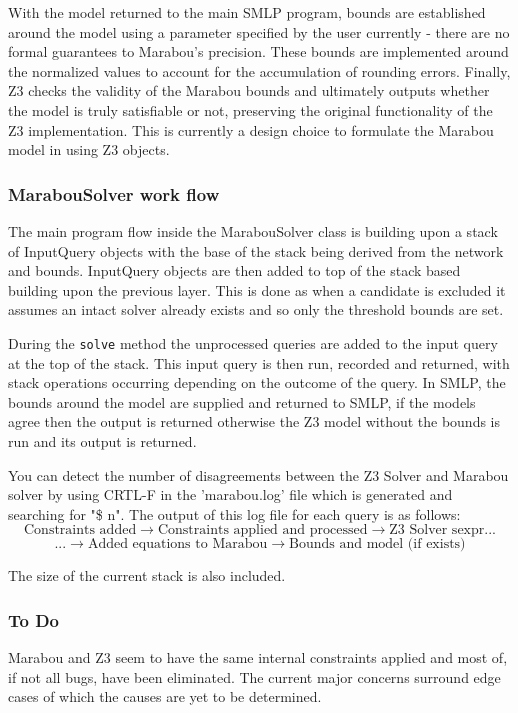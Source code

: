 \documentclass[a4paper,parskip=half]{scrartcl}
\begin{document}
With the model returned to the main SMLP program, bounds are established around the model using a parameter specified by the user currently - there are no formal guarantees to Marabou's precision. These bounds are implemented around the normalized values to account for the accumulation of rounding errors. Finally, Z3 checks the validity of the Marabou bounds and ultimately outputs whether the model is truly satisfiable or not, preserving the original functionality of the Z3 implementation. This is currently a design choice to formulate the Marabou model in using Z3 objects.

\subsubsection{MarabouSolver work flow}

The main program flow inside the MarabouSolver class is building upon a stack of InputQuery objects with the base of the stack being derived from the network and bounds. InputQuery objects are then added to top of the stack based building upon the previous layer. This is done as when a candidate is excluded it assumes an intact solver already exists and so only the threshold bounds are set.

During the \verb+solve+ method the unprocessed queries are added to the input query at the top of the stack. This input query is then run, recorded and returned, with stack operations occurring depending on the outcome of the query. In SMLP, the bounds around the model are supplied and returned to SMLP, if the models agree then the output is returned otherwise the Z3 model without the bounds is run and its output is returned. 

You can detect the number of disagreements between the Z3 Solver and Marabou solver by using CRTL-F in the 'marabou.log' file which is generated and searching for "\$ n". The output of this log file for each query is as follows: 
$$
\text{Constraints added} \longrightarrow \text{Constraints applied and processed} \longrightarrow \text{Z3 Solver sexpr} ...
$$
$$
... \longrightarrow \text{Added equations to Marabou} \longrightarrow \text{Bounds and model (if exists)}
$$

The size of the current stack is also included.

\subsubsection{To Do}

Marabou and Z3 seem to have the same internal constraints applied and most of, if not all bugs, have been eliminated. The current major concerns surround edge cases of which the causes are yet to be determined. 
\end{document}
